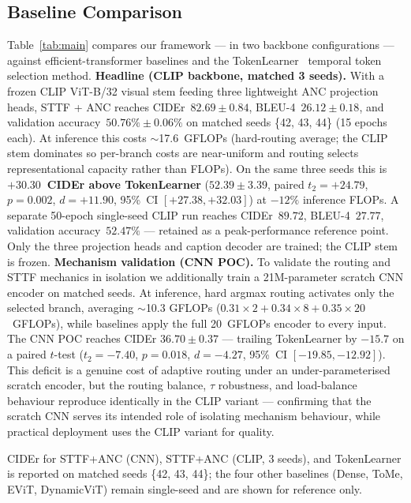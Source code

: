 \documentclass{article}
\begin{document}
\subsection{Baseline Comparison}

Table~\ref{tab:main} compares our framework — in two backbone configurations — against efficient-transformer baselines and the TokenLearner~\cite{ryoo2021tokenlearner} temporal token selection method.
\textbf{Headline (CLIP backbone, matched 3 seeds).} With a frozen CLIP ViT-B/32 visual stem feeding three lightweight ANC projection heads, STTF + ANC reaches CIDEr~$\mathbf{82.69 \pm 0.84}$, BLEU-4~$\mathbf{26.12 \pm 0.18}$, and validation accuracy~$\mathbf{50.76\% \pm 0.06\%}$ on matched seeds \{42, 43, 44\} (15 epochs each). At inference this costs $\sim$17.6~GFLOPs (hard-routing average; the CLIP stem dominates so per-branch costs are near-uniform and routing selects representational capacity rather than FLOPs). On the same three seeds this is \textbf{$+30.30$~CIDEr above TokenLearner} ($52.39 \pm 3.39$, paired $t_{2}{=}{+}24.79$, $p{=}0.002$, $d{=}{+}11.90$, 95\%~CI $[{+}27.38, {+}32.03]$) at $-12\%$ inference FLOPs. A separate 50-epoch single-seed CLIP run reaches CIDEr~$89.72$, BLEU-4~$27.77$, validation accuracy~$52.47\%$ — retained as a peak-performance reference point. Only the three projection heads and caption decoder are trained; the CLIP stem is frozen.
\textbf{Mechanism validation (CNN POC).} To validate the routing and STTF mechanics in isolation we additionally train a 21M-parameter scratch CNN encoder on matched seeds. At inference, hard argmax routing activates only the selected branch, averaging $\sim$10.3 GFLOPs ($0.31{\times}2 + 0.34{\times}8 + 0.35{\times}20$~GFLOPs), while baselines apply the full 20~GFLOPs encoder to every input. The CNN POC reaches CIDEr $36.70 \pm 0.37$ — trailing TokenLearner by $-15.7$ on a paired $t$-test ($t_{2}{=}{-}7.40$, $p{=}0.018$, $d{=}{-}4.27$, 95\%~CI $[-19.85, -12.92]$). This deficit is a genuine cost of adaptive routing under an under-parameterised scratch encoder, but the routing balance, $\tau$ robustness, and load-balance behaviour reproduce identically in the CLIP variant — confirming that the scratch CNN serves its intended role of isolating mechanism behaviour, while practical deployment uses the CLIP variant for quality.

CIDEr for STTF+ANC (CNN), STTF+ANC (CLIP, 3 seeds), and TokenLearner is reported on matched seeds \{42, 43, 44\}; the four other baselines (Dense, ToMe, EViT, DynamicViT) remain single-seed and are shown for reference only.
\end{document}
